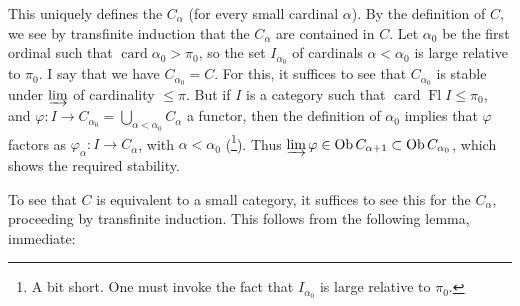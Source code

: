 \documentclass[11pt]{article}
\newcommand{\printedpage}[1]{\marginpar{\footnotesize p.~#1}}
\newcommand{\msp}[1]{\marginpar{\footnotesize [#1]}}
\begin{document}
This uniquely defines the $C_\alpha$ (for every small cardinal $\alpha$). By the definition of $C$, we see by transfinite induction that the $C_\alpha$ are contained in $C$. Let $\alpha_0$
\printedpage{45}
\msp{page 141}
be the first ordinal such that $\operatorname{card}\alpha_0>\pi_0$, so the set $I_{\alpha_0}$ of cardinals $\alpha<\alpha_0$ is large relative to $\pi_0$. I say that we have $C_{\alpha_0}=C$. For this, it suffices to see that $C_{\alpha_0}$ is stable under $\varinjlim$ of cardinality $\leqslant\pi$. But if $I$ is a category such that $\operatorname{card}\operatorname{Fl}I\leqslant\pi_0$, and $\varphi : I\longrightarrow C_{\alpha_0}=\bigcup_{\alpha<\alpha_0}C_\alpha$ a functor, then the definition of $\alpha_0$ implies that $\varphi$ factors as $\varphi_\alpha : I\longrightarrow C_\alpha$, with $\alpha<\alpha_0$ (\footnote[55]{A bit short. One must invoke the fact that $I_{\alpha_0}$ is large relative to $\pi_0$.}). Thus $\varinjlim\varphi\in\operatorname{Ob}C_{\alpha+1}\subset\operatorname{Ob}C_{\alpha_0}$, which shows the required stability. %

To see that $C$ is equivalent to a small category, it suffices to see this for the $C_\alpha$, proceeding by transfinite induction. This follows from the following lemma, immediate:
\end{document}
